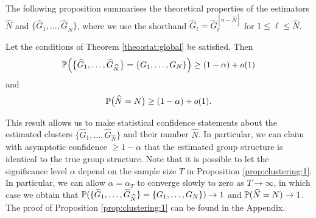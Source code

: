 \documentclass[a4paper,12pt]{article}
\begin{document}
The following proposition summarises the theoretical properties of the estimators $\widehat{N}$ and $\{ \widehat{G}_1,\ldots,\widehat{G}_{\widehat{N}} \}$, where we use the shorthand $\widehat{G}_\ell = \widehat{G}_\ell^{[n-\widehat{N}]}$ for $1 \le \ell \le \widehat{N}$. 
\begin{prop}\label{prop:clustering:1}
Let the conditions of Theorem \ref{theo:stat:global} be satisfied. Then 
\[ \mathbb{P} \Big( \big\{ \widehat{G}_1,\ldots,\widehat{G}_{\widehat{N}} \big\} = \{ G_1,\ldots, G_N \} \Big) \ge (1-\alpha) + o(1) \]
and 
\[ \mathbb{P} \big( \widehat{N} = N \big) \ge (1-\alpha) + o(1). \]
\end{prop}
This result allows us to make statistical confidence statements about the estimated clusters $\{ \widehat{G}_1,\ldots,\widehat{G}_{\widehat{N}} \}$ and their number $\widehat{N}$. In particular, we can claim with asymptotic confidence $\ge 1 - \alpha$ that the estimated group structure is identical to the true group structure. Note that it is possible to let the significance level $\alpha$ depend on the sample size $T$ in Proposition \ref{prop:clustering:1}. In particular, we can allow $\alpha = \alpha_T$ to converge slowly to zero as $T \rightarrow \infty$, in which case we obtain that $\mathbb{P} ( \{ \widehat{G}_1,\ldots,\widehat{G}_{\widehat{N}} \} = \{ G_1,\ldots, G_N \} ) \rightarrow 1$ and $\mathbb{P} ( \widehat{N} = N ) \rightarrow 1$. The proof of Proposition \ref{prop:clustering:1} can be found in the Appendix.
\end{document}
